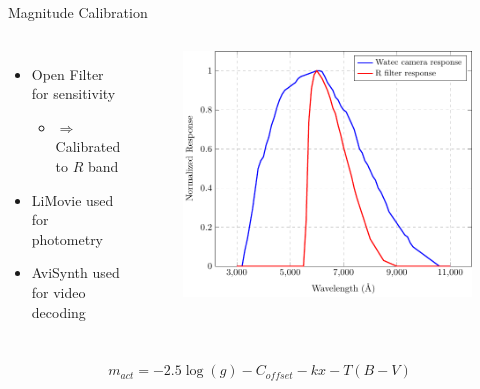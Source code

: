 \documentclass[pdf]{beamer}
\begin{document}
\begin{frame}{Magnitude Calibration}
  \begin{columns}
	\begin{itemize}
	  \item Open Filter for sensitivity
		\begin{itemize}
		  \item $\Rightarrow$ Calibrated to $R$ band
		\end{itemize}
	  \item LiMovie used for photometry
	  \item AviSynth used for video decoding
	\end{itemize}
	\begin{figure}[ht!]
	  \centering
	  \includegraphics[width=\textwidth]{Images/SensorResponses.pdf}
	\end{figure}
  \end{columns}
  \[m_{act} = -2.5\log(g) - C_{offset} - kx - T(B-V)\]
 \end{frame}
\end{document}
